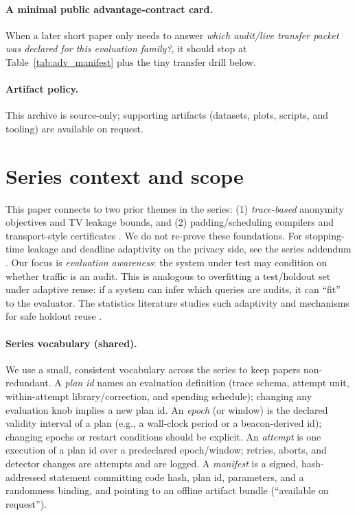 \documentclass[11pt]{article}
\begin{document}
\paragraph{A minimal public advantage-contract card.}
When a later short paper only needs to answer \emph{which audit/live transfer packet was declared for this evaluation family?}, it should stop at Table~\ref{tab:adv_manifest} plus the tiny transfer drill below.

\paragraph{Artifact policy.}
This archive is source-only; supporting artifacts (datasets, plots, scripts, and tooling) are available on request.\cite{series:artifactpolicy}


\section{Series context and scope}
This paper connects to two prior themes in the series:
(1) \emph{trace-based} anonymity objectives and TV leakage bounds, and
(2) padding/scheduling compilers and transport-style certificates \cite{series:schedcompiler,series:knapsacktransport}.
We do not re-prove these foundations.
For stopping-time leakage and deadline adaptivity on the privacy side, see the series addendum \cite{series:stoptimeaddendum}.
Our focus is \emph{evaluation awareness}: the system under test may condition on whether traffic is an audit.
This is analogous to overfitting a test/holdout set under adaptive reuse: if a system can infer which queries are audits, it can ``fit'' to the evaluator.
The statistics literature studies such adaptivity and mechanisms for safe holdout reuse \cite{dwork2015reusableholdout,dwork2014adaptive}.

\paragraph{Series vocabulary (shared).}
We use a small, consistent vocabulary across the series to keep papers non-redundant.
A \emph{plan id} names an evaluation definition (trace schema, attempt unit, within-attempt library/correction, and spending schedule);
changing any evaluation knob implies a new plan id.
An \emph{epoch} (or window) is the declared validity interval of a plan (e.g., a wall-clock period or a beacon-derived id); changing epochs or restart conditions should be explicit.
An \emph{attempt} is one execution of a plan id over a predeclared epoch/window; retries, aborts, and detector changes are attempts and are logged.
A \emph{manifest} is a signed, hash-addressed statement committing code hash, plan id, parameters, and a randomness binding, and pointing to an offline artifact bundle (``available on request'').
\end{document}
